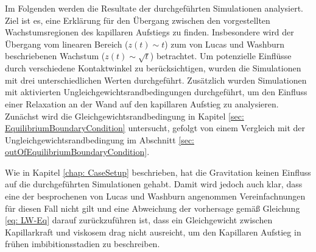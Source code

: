 Im Folgenden werden die Resultate der durchgeführten Simulationen analysiert. Ziel ist es, eine Erklärung für den Übergang zwischen den vorgestellten Wachstumsregionen des kapillaren Aufstiegs zu finden. Insbesondere wird der Übergang vom linearen Bereich ($z(t)\sim t$) zum von Lucas und Washburn beschriebenen Wachstum ($z(t)\sim \sqrt{t}$) betrachtet. Um potenzielle Einflüsse durch verschiedene Kontaktwinkel zu berücksichtigen, wurden die Simulationen mit drei unterschiedlichen Werten durchgeführt. Zusätzlich wurden Simulationen mit aktivierten Ungleichgewichtsrandbedingungen durchgeführt, um den Einfluss einer Relaxation an der Wand auf den kapillaren Aufstieg zu analysieren. 
Zunächst wird die Gleichgewichtsrandbedingung in Kapitel \ref{sec: EquilibriumBoundaryCondition} untersucht, gefolgt von einem Vergleich mit der Ungleichgewichtsrandbedingung im Abschnitt \ref{sec: outOfEquilibriumBoundaryCondition}. 

Wie in Kapitel \ref{chap: CaseSetup} beschrieben, hat die Gravitation keinen Einfluss auf die durchgeführten Simulationen gehabt. Damit wird jedoch auch klar, dass eine der besprochenen von Lucas und Washburn angenommen Vereinfachnungen für diesen Fall nicht gilt und eine Abweichung der vorhersage gemäß Gleichung \ref{eq: LW-Eq} darauf zurückzuführen ist, dass ein Gleichgewicht zwischen Kapillarkraft und viskosem drag nicht ausreicht, um den Kapillaren Aufstieg in frühen imbibitionsstadien zu beschreiben.


